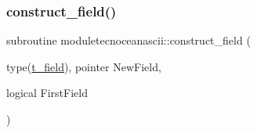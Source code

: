 \mbox{\label{namespacemoduletecnoceanascii_a5faf63426f042e591c210443525285aa}} 
\subsubsection{\texorpdfstring{construct\+\_\+field()}{construct\_field()}}
{\footnotesize\ttfamily subroutine moduletecnoceanascii\+::construct\+\_\+field (\begin{DoxyParamCaption}\item[{type(\mbox{\hyperlink{structmoduletecnoceanascii_1_1t__field}{t\+\_\+field}}), pointer}]{New\+Field,  }\item[{logical}]{First\+Field }\end{DoxyParamCaption})\hspace{0.3cm}{\ttfamily [private]}}

